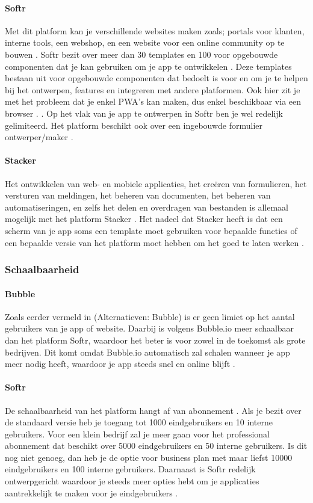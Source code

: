 \paragraph{Softr}
Met dit platform kan je verschillende websites maken zoals; portals voor klanten, interne tools, een webshop, en een website voor een online community op te bouwen\autocite{Code2023} \autocite{Youssef2023} .
Softr bezit over meer dan 30 templates en 100 voor opgebouwde componenten dat je kan gebruiken om je app te 
ontwikkelen \autocite{Frater2024} \autocite{Youssef2023}. 
Deze templates bestaan uit voor opgebouwde componenten dat bedoelt is voor en om je te helpen bij het ontwerpen, features en integreren met andere platformen. 
Ook hier zit je met het probleem dat je enkel PWA’s kan maken, dus enkel beschikbaar via een browser . \autocite{Frater2024}. 
Op het vlak van je app te ontwerpen in Softr ben je wel redelijk gelimiteerd. Het platform beschikt ook over een ingebouwde formulier ontwerper/maker \autocite{Youssef2023}. 

\paragraph{Stacker}
Het ontwikkelen van web- en mobiele applicaties, het creëren van formulieren, het versturen van meldingen, het beheren van documenten, 
het beheren van automatiseringen, en zelfs het delen en overdragen van bestanden is allemaal mogelijk met het platform 
Stacker \autocite{JDN2023}. 
Het nadeel dat Stacker heeft is dat een scherm van je app soms een template moet gebruiken voor bepaalde functies 
of een bepaalde versie van het platform moet hebben om het goed te laten werken \autocite{Advice}.
\subsubsection*{Schaalbaarheid}
\paragraph{Bubble}
Zoals eerder vermeld in (Alternatieven: Bubble) is er geen limiet op het aantal gebruikers van je app of website. Daarbij is volgens \textcite{Youssef2023} 
Bubble.io meer schaalbaar dan het platform Softr, waardoor het beter is voor zowel in de toekomst als grote bedrijven. 
Dit komt omdat Bubble.io automatisch zal schalen wanneer je app meer nodig heeft, 
waardoor je app steeds snel en online blijft \autocite{Bas2024}.
\paragraph{Softr}
De schaalbaarheid van het platform hangt af van abonnement \autocite{Frater2024}. 
Als je bezit over de standaard versie heb je toegang tot 1000 eindgebruikers en 10 interne gebruikers. 
Voor een klein bedrijf zal je meer gaan voor het professional abonnement dat beschikt over 5000 eindgebruikers en 50 interne gebruikers. Is dit nog niet genoeg, 
dan heb je de optie voor business plan met maar liefst 10000 eindgebruikers en 100 interne gebruikers. Daarnaast is Softr redelijk ontwerpgericht waardoor je steeds 
meer opties hebt om je applicaties aantrekkelijk te maken voor je eindgebruikers \autocite{Noloco2023}.
